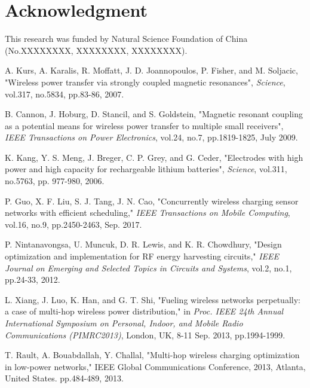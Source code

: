 \documentclass[journal,10pt]{IEEEtran}
\begin{document}
\section*{Acknowledgment}
This research was funded by Natural Science Foundation of China (No.XXXXXXXX, XXXXXXXX, XXXXXXXX).

\ifCLASSOPTIONcaptionsoff
  \newpage
\fi


\begin{thebibliography}{11}

A. Kurs, A. Karalis, R. Moffatt, J. D. Joannopoulos, P. Fisher, and M. Soljacic, "Wireless power transfer via strongly coupled magnetic resonances", \textit{Science}, vol.317, no.5834, pp.83-86, 2007.

B. Cannon, J. Hoburg, D. Stancil, and S. Goldstein, "Magnetic resonant coupling as a potential means for wireless power transfer to multiple small receivers", \textit{IEEE Transactions on Power Electronics}, vol.24, no.7, pp.1819-1825, July 2009.

K. Kang, Y. S. Meng, J. Breger, C. P. Grey, and G. Ceder, "Electrodes with high power and high capacity for rechargeable lithium batteries", \textit{Science}, vol.311, no.5763, pp. 977-980, 2006.

P. Guo, X. F. Liu, S. J. Tang, J. N. Cao, "Concurrently wireless charging sensor networks with efficient scheduling," \textit{IEEE Transactions on Mobile Computing}, vol.16, no.9, pp.2450-2463, Sep. 2017.

P. Nintanavongsa, U. Muncuk, D. R. Lewis, and K. R. Chowdhury, "Design optimization and implementation for RF energy harvesting circuits," \textit{IEEE Journal on Emerging and Selected Topics in Circuits and Systems}, vol.2, no.1, pp.24-33, 2012.

L. Xiang, J. Luo, K. Han, and G. T. Shi, "Fueling wireless networks perpetually: a case of multi-hop wireless power distribution," in \textit{Proc. IEEE 24th Annual International Symposium on Personal, Indoor, and Mobile Radio Communications (PIMRC2013)}, London, UK, 8-11 Sep. 2013, pp.1994-1999.

T. Rault, A. Bouabdallah, Y. Challal, "Multi-hop wireless charging optimization in low-power networks," IEEE Global Communications Conference, 2013, Atlanta, United States. pp.484-489, 2013.


\end{thebibliography}
\end{document}
